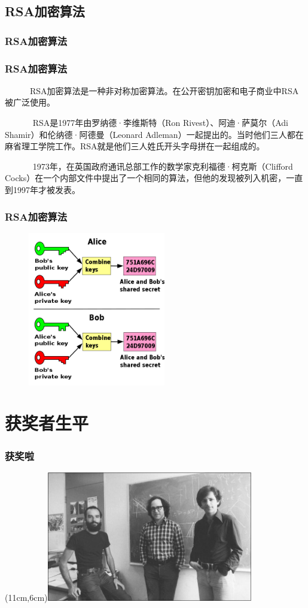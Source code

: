 \documentclass[slidestop,compress,mathserif]{beamer}
\begin{document}
\subsection{\hfill RSA加密算法}
\begin{frame}
  \frametitle{RSA加密算法}
\end{frame}
\begin{frame}
  \transsplitverticalin
  \frametitle{RSA加密算法}
 ~ ~ ~ ~RSA加密算法是一种非对称加密算法。在公开密钥加密和电子商业中RSA被广泛使用。

~ ~ ~ ~ RSA是1977年由罗纳德·李维斯特（Ron Rivest）、阿迪·萨莫尔（Adi Shamir）和伦纳德·阿德曼（Leonard Adleman）一起提出的。当时他们三人都在麻省理工学院工作。RSA就是他们三人姓氏开头字母拼在一起组成的。

~ ~ ~ ~ 1973年，在英国政府通讯总部工作的数学家克利福德·柯克斯（Clifford Cocks）在一个内部文件中提出了一个相同的算法，但他的发现被列入机密，一直到1997年才被发表。

\end{frame}


\begin{frame}
  \transboxout
  \frametitle{RSA加密算法}
  \begin{center}
    \begin{figure}
      \includegraphics[width=6cm]{Publickeysharedsecret.svg.png}
    \end{figure}
  \end{center}
\end{frame}

\section{获奖者生平}

\begin{frame}
  \frametitle{获奖啦}
  \parpic(11cm,6cm){\includegraphics[width=9cm]{3peoples}}

\end{frame}
\end{document}
